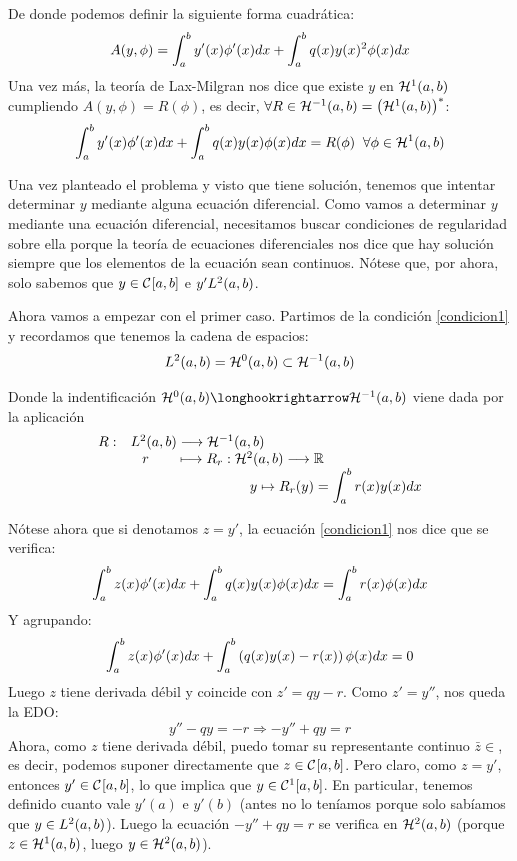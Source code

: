 De donde podemos definir la siguiente forma cuadrática: 
\[
A(y,\phi)=\integral{a}{b}{y'(x)\phi'(x)dx}+\integral{a}{b}{q(x)y(x)^2\phi(x)dx}
\]
Una vez más, la teoría de Lax-Milgran nos dice que existe $y$ en $\sobolev{1}$ cumpliendo $A(y,\phi)=R(\phi)$, es decir, $ \forall R\in \sobolev{-1}=\left(\sobolev{1}\right)^*$:
\begin{equation}
\label{condicion1}
\integral{a}{b}{y'(x)\phi'(x)dx}+\integral{a}{b}{q(x)y(x)\phi(x)dx}=R(\phi) \;\; \forall \phi\in\sobolev{1}
\end{equation}

Una vez planteado el problema y visto que tiene solución, tenemos que intentar determinar $y$ mediante alguna ecuación diferencial. Como vamos a determinar $y$ mediante una ecuación diferencial, necesitamos buscar condiciones de regularidad sobre ella porque la teoría de ecuaciones diferenciales nos dice que hay solución siempre que los elementos de la ecuación sean continuos. Nótese que, por ahora, solo sabemos que $y\in\continuas$ e $y'\lebesgue{2}$.
   
Ahora vamos a empezar con el primer caso. Partimos de la condición \eqref{condicion1} y recordamos que tenemos la cadena de espacios:
\[
\lebesgue{2} = \sobolev{0} \subset \sobolev{-1}
\]

Donde la indentificación $\sobolev{0}\longhookrightarrow\sobolev{-1}$ viene dada por la aplicación
\[
\begin{array}{ll}
R: & \lebesgue{2} \longrightarrow \sobolev{-1} \\
  &\;\;\; r \;\;\; \;\;\;\; \longmapsto    \funcion{R_r}{\sobolev{2}}{\R} \\
  & \hspace*{3cm} y \mapsto R_r(y)=\integral{a}{b}{r(x)y(x)dx} 
\end{array}
\]

Nótese ahora que si denotamos $z=y'$, la ecuación \eqref{condicion1} nos dice que se verifica:
\begin{equation}
\label{condicion2}
\integral{a}{b}{z(x)\phi'(x)dx}+\integral{a}{b}{q(x)y(x)\phi(x)dx}=\integral{a}{b}{r(x)\phi(x)dx}
\end{equation}
Y agrupando:
\[
\integral{a}{b}{z(x)\phi'(x)dx}+\integral{a}{b}{\left(q(x)y(x)-r(x)\right)\phi(x)dx}=0
\]
Luego $z$ tiene derivada débil y coincide con $z'=qy-r$. Como $z'=y''$, nos queda la EDO:
\[
y''-qy=-r \Rightarrow -y''+qy=r
\]
Ahora, como $z$ tiene derivada débil, puedo tomar su representante continuo $\bar{z}\in$, es decir, podemos suponer directamente que $z\in\continuas$. Pero claro, como $z=y'$, entonces $y'\in\continuas$, lo que implica que $y\in\continuas[1]$. En particular, tenemos definido cuanto vale $y'(a)$ e $y'(b)$ (antes no lo teníamos porque solo sabíamos que $y\in\lebesgue{2}$). Luego la ecuación $-y''+qy=r$ se verifica en $\sobolev{2}$ (porque $z\in\sobolev{1}$, luego $y\in\sobolev{2}$).

